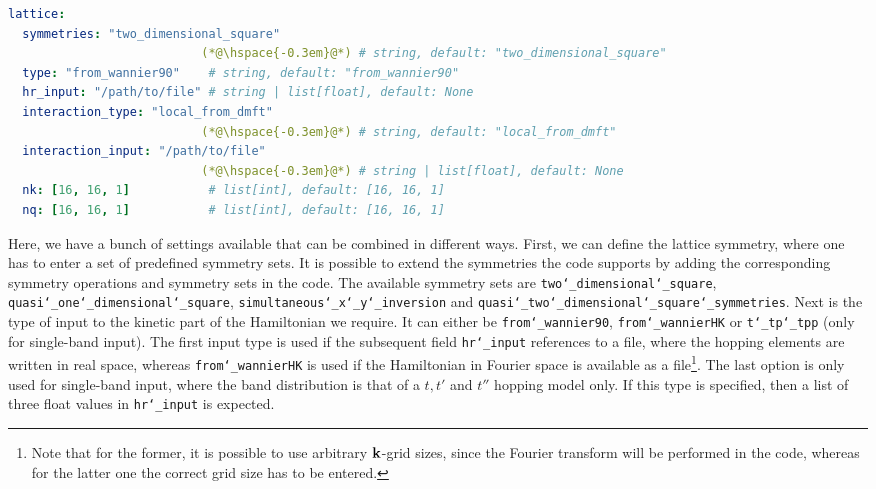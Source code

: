 \documentclass[\main/main.tex]{subfiles}
\begin{document}
\begin{minipage}{\textwidth}%
\begin{lstlisting}[language=yaml]
lattice:
  symmetries: "two_dimensional_square"
                           (*@\hspace{-0.3em}@*) # string, default: "two_dimensional_square"
  type: "from_wannier90"    # string, default: "from_wannier90"
  hr_input: "/path/to/file" # string | list[float], default: None
  interaction_type: "local_from_dmft"
                           (*@\hspace{-0.3em}@*) # string, default: "local_from_dmft"
  interaction_input: "/path/to/file"
                           (*@\hspace{-0.3em}@*) # string | list[float], default: None
  nk: [16, 16, 1]           # list[int], default: [16, 16, 1]
  nq: [16, 16, 1]           # list[int], default: [16, 16, 1]
\end{lstlisting}
\end{minipage}
Here, we have a bunch of settings available that can be combined in different ways. First, we can define the lattice symmetry, where one has to enter a set of predefined symmetry sets. It is possible to extend the symmetries the code supports by adding the corresponding symmetry operations and symmetry sets in the code. The available symmetry sets are \texttt{two\char`_dimensional\char`_square}, \texttt{quasi\char`_one\char`_dimensional\char`_square}, \texttt{simultaneous\char`_x\char`_y\char`_inversion} and \texttt{quasi\char`_two\char`_dimensional\char`_square\char`_symmetries}. Next is the type of input to the kinetic part of the Hamiltonian we require. It can either be \texttt{from\char`_wannier90}, \texttt{from\char`_wannierHK} or \texttt{t\char`_tp\char`_tpp} (only for single-band input). The first input type is used if the subsequent field \texttt{hr\char`_input} references to a file, where the hopping elements are written in real space, whereas \texttt{from\char`_wannierHK} is used if the Hamiltonian in Fourier space is available as a file\footnote{Note that for the former, it is possible to use arbitrary $\textbf{k}$-grid sizes, since the Fourier transform will be performed in the code, whereas for the latter one the correct grid size has to be entered.}. The last option is only used for single-band input, where the band distribution is that of a $t, t'$ and $t''$ hopping model only. If this type is specified, then a list of three float values in \texttt{hr\char`_input} is expected.
\end{document}
